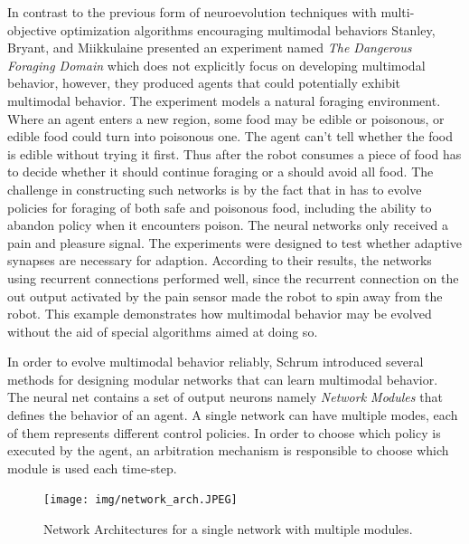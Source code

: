 \documentclass[format=acmsmall, review=false, screen=true]{acmart}
\begin{document}
In contrast to the previous form of neuroevolution techniques with multi-objective optimization algorithms encouraging multimodal behaviors Stanley, Bryant, and Miikkulaine presented an experiment named \emph{The Dangerous Foraging Domain} \cite{stanley2003evolving} which does not explicitly focus on developing multimodal behavior, however, they produced agents that could potentially exhibit multimodal behavior. The experiment models a natural foraging environment. Where an agent enters a new region, some food may be edible or poisonous, or edible food could turn into poisonous one. The agent can't tell whether the food is edible without trying it first. Thus after the robot consumes a piece of food has to decide whether it should continue foraging or a should avoid all food. The challenge in constructing such networks is by the fact that in has to evolve policies for foraging of both safe and poisonous food, including the ability to abandon policy when it encounters poison. The neural networks only received a pain and pleasure signal. The experiments were designed to test whether adaptive synapses are necessary for adaption. According to their results, the networks using recurrent connections performed well, since the recurrent connection on the out output activated by the pain sensor made the robot to spin away from the robot. This example demonstrates how multimodal behavior may be evolved without the aid of special algorithms aimed at doing so.

In order to evolve multimodal behavior reliably, Schrum \cite{schrum2014evolving} introduced several methods for designing modular networks that can learn multimodal behavior. The neural net contains a set of output neurons namely \emph{Network Modules} that defines the behavior of an agent. A single network can have multiple modes, each of them represents different control policies. In order to choose which policy is executed by the agent, an arbitration mechanism is responsible to choose which module is used each time-step.

\begin{figure}[H]
  \texttt{[image: img/network\_arch.JPEG]}
  \caption{\label{fig:paretofront}Network Architectures for a single network with multiple modules.}
\end{figure}
\end{document}
